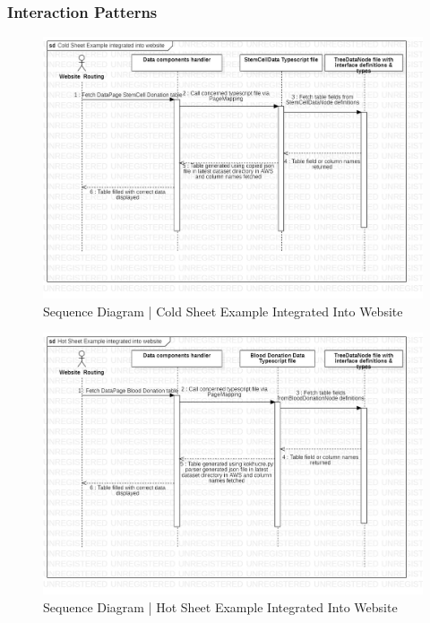 \subsubsection{Interaction Patterns}

\begin{figure}[H]
  \centering
  \includegraphics[width=\linewidth]{img/sequence-diagram-1.jpg}
  \caption{Sequence Diagram | Cold Sheet Example Integrated Into Website}
\end{figure}

\begin{figure}[H]
  \centering
  \includegraphics[width=\linewidth]{img/sequence-diagram-2.jpg}
  \caption{Sequence Diagram | Hot Sheet Example Integrated Into Website}
\end{figure}


